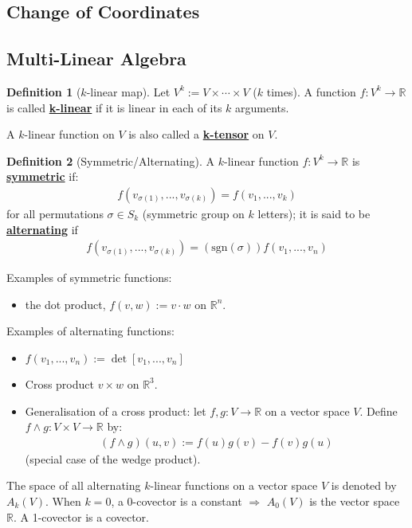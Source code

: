 \documentclass[11pt]{scrartcl}
\newcommand{\R}[0]{\mathbb{R}}
\theoremstyle{definition}
\newtheorem{definition}{Definition}
\theoremstyle{remark}
\newcommand{\dfn}[1]{\textbf{\underline{#1}}}
\begin{document}
{\subsection{Change of Coordinates}

\subsection{Multi-Linear Algebra}
\begin{definition}[$k$-linear map]
	Let $V^k := V \times \cdots \times V$ ($k$ times). A function $f:V^k \rightarrow \R$ is called \dfn{k-linear} if it is linear in each of its $k$ arguments. 
\end{definition}
A $k$-linear function on $V$ is also called a \dfn{k-tensor} on $V$. 

\begin{definition}[Symmetric/Alternating]
	A $k$-linear function $f: V^k \rightarrow \R$ is \dfn{symmetric} if: 
	\begin{align*}
		f(v_{\sigma(1)}, ..., v_{\sigma(k)}) = f(v_1, ..., v_k)
	\end{align*}
	for all permutations $\sigma \in S_k$ (symmetric group on $k$ letters); it is said to be \dfn{alternating} if
	\begin{align*}
		f(v_{\sigma(1)}, ..., v_{\sigma(k)} ) = (\text{sgn}(\sigma)) f(v_1, ..., v_n) 
	\end{align*}
\end{definition}
Examples of symmetric functions: 
\begin{itemize}[noitemsep]
	\item the dot product, $f(v,w) := v \cdot w$ on $\R^n$. 
\end{itemize}
Examples of alternating functions: 
\begin{itemize}[noitemsep]
	\item $f(v_1, ..., v_n) := \det [v_1, ..., v_n]$
	\item Cross product $v \times w$ on $\R^3$. 
	\item Generalisation of a cross product: let $f, g: V \rightarrow \R$ on a vector space $V$. Define $f \wedge g: V \times V \rightarrow \R$ by: 
	\begin{align*}
		( f \wedge g ) (u,v) := f(u) g(v) - f(v) g(u) 
	\end{align*}
	(special case of the wedge product). 
\end{itemize}
The space of all alternating $k$-linear functions on a vector space $V$ is denoted by $A_k(V)$. When $k=0$, a $0$-covector is a constant $\Rightarrow$ $A_0(V)$ is the vector space $\R$. A 1-covector is a covector. 

}
\end{document}
